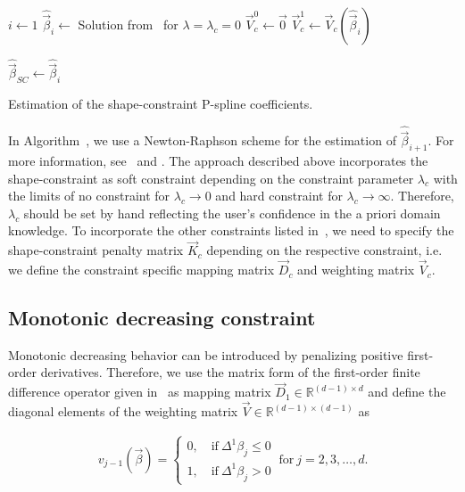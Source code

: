 \begin{algorithm}[H]
	\SetAlgoLined
	$ i \gets 1$\;
	$\hat{\vec{\beta}}_{i} \gets$ Solution from~ for $\lambda = \lambda_c = 0$\;
	$\vec{V}^0_c \gets \vec{0}$\;
	$\vec{V}^1_c \gets \vec{V}_c(\hat{\vec{\beta}}_{i})$\;

	$\hat{\vec{\beta}}_{SC} \gets \hat{\vec{\beta}}_{i}$\;
	\caption{Estimation of the shape-constraint P-spline coefficients.}
	\label{alg:scp}
\end{algorithm}
%
In Algorithm~, we use a Newton-Raphson scheme for the estimation of $\hat{\vec{\beta}}_{i+1}$. For more information, see~ and \cite{bollaerts2006simple}. The approach described above incorporates the shape-constraint as soft constraint depending on the constraint parameter $\lambda_c$ with the limits of no constraint for $\lambda_c \rightarrow 0$ and hard constraint for $\lambda_c \rightarrow \infty$. Therefore, $\lambda_c$ should be set by hand reflecting the user's confidence in  the a priori domain knowledge. To incorporate the other constraints listed in~, we need to specify the shape-constraint  penalty matrix $\vec{K}_c$ depending on the respective constraint, i.e. we define the constraint specific mapping matrix $\vec{D}_c$ and weighting matrix $\vec{V}_c$. 

\subsection{Monotonic decreasing constraint} \label{subsec:MDC}

Monotonic decreasing behavior can be introduced by penalizing positive first-order derivatives. Therefore, we use the matrix form of the first-order finite difference operator given in~ as mapping matrix $\vec{D}_1 \in \mathbb{R}^{(d-1) \times d}$ and define the diagonal elements of the weighting matrix $\vec{V} \in \mathbb{R}^{(d-1) \times (d-1)}$ as

\begin{align} \label{eq:weighting-matrix-dec-diagonal}
	v_{j-1}(\vec{\beta}) = \begin{cases}
		0, \quad \text{if} \ \Delta^1\beta_j \le 0 \\ 
		1, \quad \text{if} \ \Delta^1\beta_j > 0
	\end{cases}	\ \text{for} \ j=2,3, \dots, d.
\end{align}


